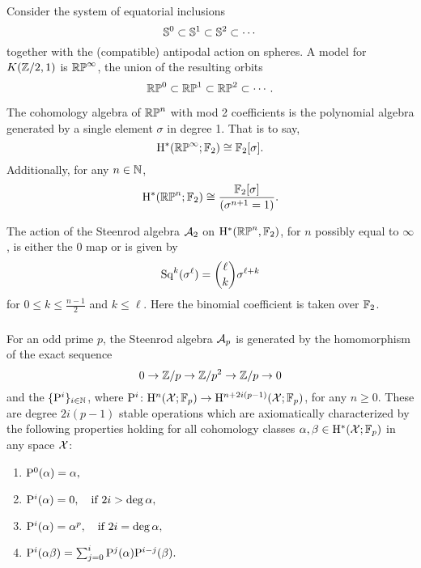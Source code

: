 \subsubsection{}
\label{sss:cohomology_rpn}
Consider the system of equatorial inclusions
\[
\mathbb{S}^0 \subset \mathbb{S}^1 \subset \mathbb{S}^2 \subset \dotsb
\]
together with the (compatible) antipodal action on spheres.
A model for \(K(\mathbb{Z}/2, 1)\) is \(\mathbb{RP}^\infty\), the union of the resulting orbits
\[
\mathbb{RP}^0 \subset \mathbb{RP}^1 \subset \mathbb{RP}^2 \subset \dotsb.
\]

The cohomology algebra of $\mathbb{RP}^n$ with mod 2 coefficients is the polynomial algebra generated by a single element $\sigma$ in degree 1.
That is to say,
\[
\mathrm{H}^\ast(\mathbb{RP}^\infty; {\mathbb{F}_2}) \cong {\mathbb{F}_2}[\sigma].
\]
Additionally, for any $n \in \mathbb{N}$,
\[
\mathrm{H}^\ast(\mathbb{RP}^n; {\mathbb{F}_2}) \cong \frac{{\mathbb{F}_2}[\sigma]}{(\sigma^{n+1} = 1)}.
\]

The action of the Steenrod algebra $\mathcal{A}_2$ on $\mathrm{H}^*(\mathbb{RP}^n, {\mathbb{F}_2})$, for $n$ possibly equal to $\infty$, is either the 0 map or is given by
\[
\operatorname{Sq}^k(\sigma^\ell) = \binom{\ell}{k}\sigma^{\ell+k}
\]
for $0 \leq k \leq \frac{n-1}{2}$ and $k \leq \ell$.
Here the binomial coefficient is taken over \({\mathbb{F}_2}\).

\subsubsection{} For an odd prime \(p\), the Steenrod algebra $\mathcal{A}_p$ is generated by the  homomorphism of the exact sequence
\[
0 \to \mathbb{Z}/p \to \mathbb{Z}/p^2 \to \mathbb{Z}/p \to 0
\]
and the  \(\{\mathrm{P}^i\}_{i \in \mathbb{N}}\), where $\mathrm{P}^i \colon \mathrm{H}^n(\mathcal{X}; {\mathbb{F}_p}) \to \mathrm{H}^{n+2i(p-1)}(\mathcal{X}; {\mathbb{F}_p})$, for any $n\geq 0$.
These are degree \(2i(p-1)\) stable operations which are axiomatically characterized by the following properties holding for all cohomology classes \(\alpha, \beta \in \mathrm{H}^*(\mathcal{X}; {\mathbb{F}_p})\) in any space \(\mathcal{X}\):

\begin{enumerate}
	\item \(\mathrm{P}^0(\alpha) = \alpha,\)
	\item \(\mathrm{P}^i(\alpha) = 0, \quad \text{if } 2i > \deg\alpha,\)
	\item \(\mathrm{P}^i(\alpha) = \alpha^p, \quad \text{if } 2i = \deg\alpha,\)
	\item \(\mathrm{P}^i(\alpha \beta) = \textstyle\sum_{j=0}^{i} \mathrm{P}^j(\alpha) \mathrm{P}^{i-j}(\beta).\)
\end{enumerate}

\subsubsection{}

